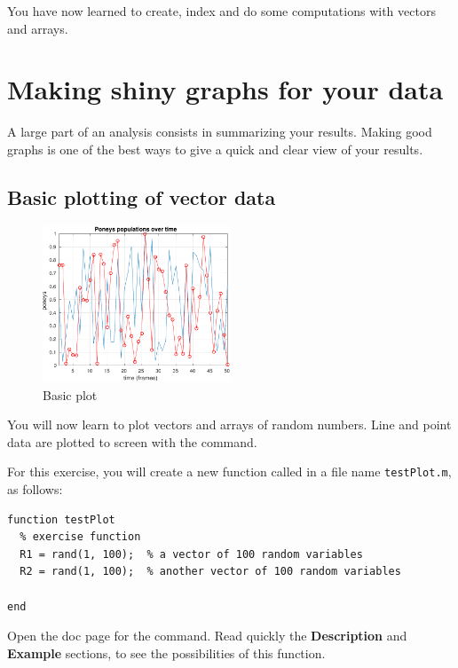 \documentclass{article}
\begin{document}
You have now learned to create, index and do some computations with vectors and arrays.


\section{Making shiny graphs for your data}

A large part of an analysis consists in summarizing your results.
Making good graphs is one of the best ways to give a quick and clear view of your results.


\subsection{Basic plotting of vector data}

\begin{figure}
  \centering
  \includegraphics[width=0.5\textwidth]{basicplot.pdf}
  \caption{Basic plot}\label{fig:basic}
\end{figure}

You will now learn to plot vectors and arrays of random numbers.
Line and point data are plotted to screen with the  command.

For this exercise, you will create a new function called  in a file name \verb|testPlot.m|, as follows:
\begin{lstlisting}
function testPlot
  % exercise function
  R1 = rand(1, 100);  % a vector of 100 random variables
  R2 = rand(1, 100);  % another vector of 100 random variables

end
\end{lstlisting}

Open the doc page for the  command.
Read quickly the \textbf{Description} and \textbf{Example} sections, to see the possibilities of this function.
\end{document}

